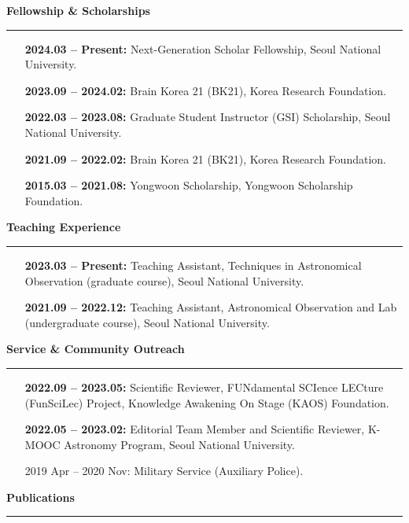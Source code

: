 \documentclass[11pt]{article}
\begin{document}
\textbf{\large \textsf{Fellowship \& Scholarships}}
\vspace{3pt}
\hrule
\begin{itemize}[leftmargin=115pt, noitemsep]
    \item[\textbf{2024.03 -- Present:}] Next-Generation Scholar Fellowship, Seoul National University.
    \item[\textbf{2023.09 -- 2024.02:}] Brain Korea 21 (BK21), Korea Research Foundation.
    \item[\textbf{2022.03 -- 2023.08:}] Graduate Student Instructor (GSI) Scholarship, Seoul National University.
    \item[\textbf{2021.09 -- 2022.02:}] Brain Korea 21 (BK21), Korea Research Foundation.
    \item[\textbf{2015.03 -- 2021.08:}] Yongwoon Scholarship, Yongwoon Scholarship Foundation.
\end{itemize}


\textbf{\large \textsf{Teaching Experience}}
\vspace{3pt}
\hrule
\begin{itemize}[leftmargin=115pt, noitemsep]
    \item[\textbf{2023.03 -- Present:}] Teaching Assistant, Techniques in Astronomical Observation (graduate course), Seoul National University.
    \item[\textbf{2021.09 -- 2022.12:}] Teaching Assistant, Astronomical Observation and Lab (undergraduate course), Seoul National University.
\end{itemize}


\textbf{\large \textsf{Service \& Community Outreach}}
\vspace{3pt}
\hrule
\begin{itemize}[leftmargin=115pt, noitemsep]
    \item[\textbf{2022.09 -- 2023.05:}] Scientific Reviewer, FUNdamental SCIence LECture (FunSciLec) Project, Knowledge Awakening On Stage (KAOS) Foundation.
    \item[\textbf{2022.05 -- 2023.02:}] Editorial Team Member and Scientific Reviewer, K-MOOC Astronomy Program, Seoul National University.
    \item[2019 Apr -- 2020 Nov:] Military Service (Auxiliary Police).
\end{itemize}


\textbf{\large \textsf{Publications}}
\vspace{3pt}
\hrule

\begin{etaremune}
    \item {}
    \item {}
    \item {}
\end{etaremune}

% 
% 
% 

\end{document}
